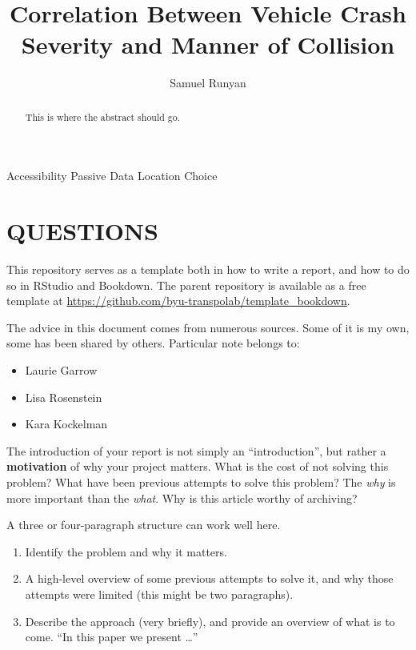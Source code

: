 \documentclass[3p, authoryear]{elsarticle} %
\providecommand{\tightlist}{%
  \setlength{\itemsep}{0pt}\setlength{\parskip}{0pt}}
\begin{document}
\begin{frontmatter}

  \title{Correlation Between Vehicle Crash Severity and Manner of Collision}
    \author[Brigham Young University]{Samuel Runyan}
      \address[Brigham Young University]{Civil and Environmental Engineering Department, 430 Engineering Building, Provo, Utah 84602}
    
  \begin{abstract}
  This is where the abstract should go.
  \end{abstract}
   \begin{keyword} Accessibility Passive Data Location Choice\end{keyword}
 \end{frontmatter}

\hypertarget{intro}{%
\section{QUESTIONS}\label{intro}}

This repository serves as a template both in how to write a report, and how
to do so in RStudio and Bookdown. The parent repository is available as a free
template at \url{https://github.com/byu-transpolab/template_bookdown}.

The advice in this document comes from numerous sources. Some of it is my own, some
has been shared by others. Particular note belongs to:

\begin{itemize}
\tightlist
\item
  Laurie Garrow
\item
  Lisa Rosenstein
\item
  Kara Kockelman
\end{itemize}

The introduction of your report is not simply an ``introduction'', but rather a
\textbf{motivation} of why your project matters. What is the cost of not solving
this problem? What have been previous attempts to solve this problem? The \emph{why}
is more important than the \emph{what}. Why is this article worthy of archiving?

A three or four-paragraph structure can work well here.

\begin{enumerate}
\def\labelenumi{\arabic{enumi}.}
\tightlist
\item
  Identify the problem and why it matters.
\item
  A high-level overview of some previous attempts to solve it, and why those
  attempts were limited (this might be two paragraphs).
\item
  Describe the approach (very briefly), and provide an overview of what is
  to come. ``In this paper we present \ldots{}''
\end{enumerate}
\end{document}
